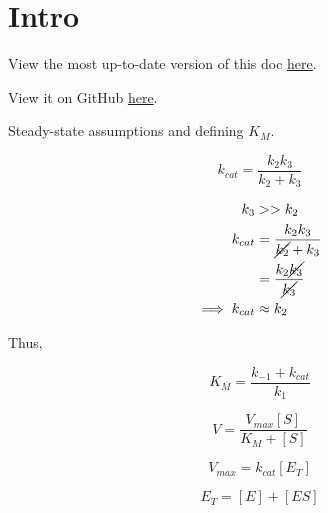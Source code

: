 \documentclass{article}
\title{\vspace{-2cm}}
\author{MedicinalYoyos}
\begin{document}
\maketitle

\section*{Intro}

View the most up-to-date version of this doc \href{https://www.overleaf.com/read/rgykqvzvfnvv}{here}.

View it on GitHub \href{https://github.com/Yoyomanzoor/EnzymeKinetics/blob/main/main.pdf}{here}.

Steady-state assumptions and defining $K_M$.

\begin{center}
\end{center}

\begin{equation}
    k_{cat} = \frac{k_2k_3}{k_2 + k_3}
\end{equation}

\begin{align*}
    k_3 &>> k_2 \\
    k_{cat} &= \frac{k_2k_3}{\cancel{k_2} + k_3} \\
    &= \frac{k_2\cancel{k_3}}{\cancel{k_3}} \nonumber \\
    \implies k_{cat} &\approx k_2
\end{align*}

Thus,

\begin{center}
\end{center}

\begin{equation}
    K_M = \frac{k_{-1} + k_{cat}}{k_1}
\end{equation}

\begin{equation}
    V = \frac{V_{max}[S]}{K_M + [S]}
\end{equation}

\begin{equation}
    V_{max} = k_{cat} [E_T]
\end{equation}

\begin{equation}
    E_T = [E] + [ES]
\end{equation}
\end{document}
